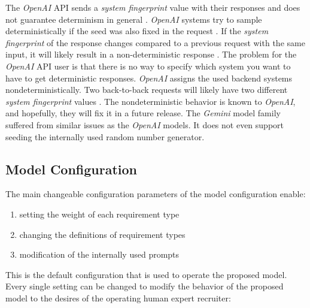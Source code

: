 \documentclass[draft,final]{thesisclass} %
\begin{document}
The \textit{OpenAI} API sends a \textit{system fingerprint} value with their responses and does not guarantee determinism in general \parencite{openai_chat_api}.
\textit{OpenAI} systems try to sample deterministically if the seed was also fixed in the request \parencite{openai_chat_api}.
If the \textit{system fingerprint} of the response changes compared to a previous request with the same input, it will likely result in a non-deterministic response \parencite{openai_chat_api}.
The problem for the \textit{OpenAI} API user is that there is no way to specify which system you want to have to get deterministic responses. \textit{OpenAI} assigns the used backend systems nondeterministically. Two back-to-back requests will likely have two different \textit{system fingerprint} values \parencite{openai_chat_api}.
The nondeterministic behavior is known to \textit{OpenAI}, and hopefully, they will fix it in a future release.
The \textit{Gemini} model family suffered from similar issues as the \textit{OpenAI} models. It does not even support seeding the internally used random number generator.

\subsection{Model Configuration} \label{model_configuration}
The main changeable configuration parameters of the model configuration enable: 
\begin{enumerate}
    \item setting the weight of each requirement type
    \item changing the definitions of requirement types
    \item modification of the internally used prompts
\end{enumerate}
This is the default configuration that is used to operate the proposed model. 
Every single setting can be changed to modify the behavior of the proposed model to the desires of the operating human expert recruiter:

\end{document}

